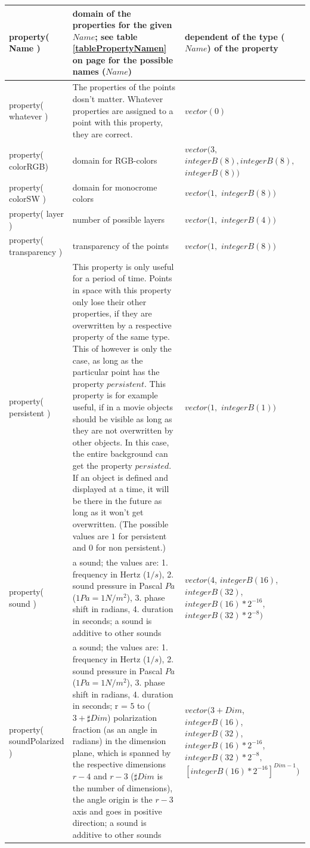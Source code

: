 \begin{center}
\begin{longtable}{|p{20mm}|p{55mm}|p{50mm}|}
	property( Name ) & domain of the properties for the given $Name$; see table \ref{tablePropertyNamen} on page \pageref{tablePropertyNamen} for the possible names ($Name$) & dependent of the type ($Name$) of the property \\\hline
	property( whatever ) & The properties of the points dosn't matter. Whatever properties are assigned to a point with this property, they are correct. & $vector( 0 )$\\\hline
	property( colorRGB) & domain for RGB-colors & $vector( 3,$ $ integerB(8), integerB(8),$ $ integerB(8) )$\\\hline
	property( colorSW ) & domain for monocrome colors & $vector( 1,$ $integerB(8) )$\\\hline
	property( layer ) & number of possible layers & $vector( 1,$ $integerB(4) )$\\\hline
	property( transparency ) & transparency of the points & $vector( 1,$ $integerB(8) )$\\\hline
	property( persistent ) & This property is only useful for a period of time. Points in space with this property only lose their other properties, if they are overwritten by a respective property of the same type. This of however is only the case, as long as the particular point has the property $persistent$. This property is for example useful, if in a movie objects should be visible as long as they are not overwritten by other objects. In this case, the entire background can get the property $persisted$. If an object is defined and displayed at a time, it will be there in the future as long as it won't get overwritten. (The possible values are $1$ for persistent and $0$ for non persistent.) &  $vector( 1,$ $ integerB(1) )$\\\hline

	property( sound ) & a sound; the values are: 1. frequency in Hertz ($1/s$), 2. sound pressure in Pascal $Pa$ ($1 Pa= 1 N/m^2$), 3. phase shift in radians, 4. duration in seconds; a sound is additive to other sounds & $vector( 4$, $integerB(16)$, $integerB(32)$, $integerB(16) * 2^{-16}$, $integerB(32) * 2^{-8}  )$\\\hline
	property( soundPolarized ) & a sound; the values are: 1. frequency in Hertz ($1/s$), 2. sound pressure in Pascal $Pa$ ($1 Pa= 1 N/m^2$), 3. phase shift in radians, 4. duration in seconds; r = $5$ to ($3 + \sharp Dim$) polarization fraction (as an angle in radians) in the dimension plane, which is spanned by the respective dimensions $r-4$ and $r-3$ ($\sharp Dim$ is the number of dimensions), the angle origin is the $r-3$ axis and goes in positive direction; a sound is additive to other sounds & $vector( 3 + Dim$, $integerB(16)$, $integerB(32)$, $integerB(16) * 2^{-16}$, $integerB(32) * 2^{-8},$ $[integerB(16) * 2^{-16}]^{Dim-1}  )$  \\\hline


\end{longtable}
\end{center}
